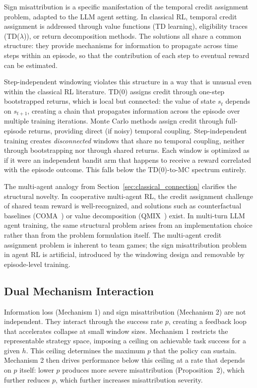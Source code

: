 Sign misattribution is a specific manifestation of the temporal credit assignment problem, adapted to the LLM agent setting. In classical RL, temporal credit assignment is addressed through value functions (TD learning), eligibility traces (TD($\lambda$)), or return decomposition methods. The solutions all share a common structure: they provide mechanisms for information to propagate across time steps within an episode, so that the contribution of each step to eventual reward can be estimated.

Step-independent windowing violates this structure in a way that is unusual even within the classical RL literature. TD(0) assigns credit through one-step bootstrapped returns, which is local but connected: the value of state $s_t$ depends on $s_{t+1}$, creating a chain that propagates information across the episode over multiple training iterations. Monte Carlo methods assign credit through full-episode returns, providing direct (if noisy) temporal coupling. Step-independent training creates \textit{disconnected} windows that share no temporal coupling, neither through bootstrapping nor through shared returns. Each window is optimized as if it were an independent bandit arm that happens to receive a reward correlated with the episode outcome. This falls below the TD(0)-to-MC spectrum entirely.

The multi-agent analogy from Section~\ref{sec:classical_connection} clarifies the structural novelty. In cooperative multi-agent RL, the credit assignment challenge of shared team reward is well-recognized, and solutions such as counterfactual baselines (COMA~\cite{foerster2018coma}) or value decomposition (QMIX~\cite{rashid2018qmix}) exist. In multi-turn LLM agent training, the same structural problem arises from an implementation choice rather than from the problem formulation itself. The multi-agent credit assignment problem is inherent to team games; the sign misattribution problem in agent RL is artificial, introduced by the windowing design and removable by episode-level training.

\subsection{Dual Mechanism Interaction}
\label{sec:discussion_interaction}

Information loss (Mechanism 1) and sign misattribution (Mechanism 2) are not independent. They interact through the success rate $p$, creating a feedback loop that accelerates collapse at small window sizes. Mechanism 1 restricts the representable strategy space, imposing a ceiling on achievable task success for a given $h$. This ceiling determines the maximum $p$ that the policy can sustain. Mechanism 2 then drives performance below this ceiling at a rate that depends on $p$ itself: lower $p$ produces more severe misattribution (Proposition~2), which further reduces $p$, which further increases misattribution severity.

